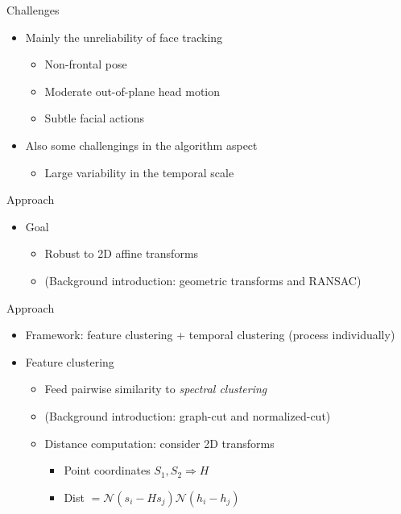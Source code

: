 \documentclass[12pt]{beamer}
\begin{document}
\begin{frame}{Challenges}
	\begin{itemize}
		\item Mainly the unreliability of face tracking
		\begin{itemize}
			\item Non-frontal pose
			\item Moderate out-of-plane head motion
			\item Subtle facial actions
		\end{itemize}
		\item Also some challengings in the algorithm aspect
		\begin{itemize}
			\item Large variability in the temporal scale
		\end{itemize}
	\end{itemize}
\end{frame}

\begin{frame}{Approach}
	\begin{itemize}
		\item Goal
		\begin{itemize}
			\item Robust to 2D affine transforms
			\item (Background introduction: geometric transforms and RANSAC)
		\end{itemize}
	\end{itemize}
\end{frame}

\begin{frame}{Approach}
	\begin{itemize}
		\item Framework: feature clustering + temporal clustering (process individually)
		\item Feature clustering
		\begin{itemize}
			\item Feed pairwise similarity to \emph{spectral clustering}
			\item (Background introduction: graph-cut and normalized-cut)
			\item Distance computation: consider 2D transforms
			\begin{itemize}
				\item Point coordinates $S_1, S_2 \Rightarrow H$
				\item Dist $= \mathcal{N}(s_i - Hs_j) \mathcal{N}(h_i - h_j)$
			\end{itemize}
		\end{itemize}
	\end{itemize}
\end{frame}
\end{document}
